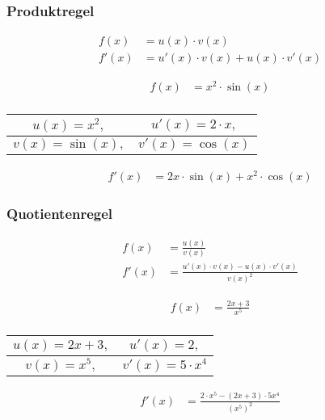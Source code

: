 \documentclass[11pt, openany]{book}
\begin{document}
\subsubsection{Produktregel}
\noindent\begin{minipage}{\boxwidth}
\begin{tcolorbox}
\begin{align*}
    f(x) &= u(x)\cdot v(x) \\
    f'(x) &= u'(x)\cdot v(x) + u(x)\cdot v'(x)
\end{align*}
\end{tcolorbox}
\end{minipage}
\hfill
\begin{minipage}{\examplewidth}
\begin{align*}
    f(x) &= x^2\cdot \sin(x) \\
\end{align*}
\begin{tabular}{|c|c|}
\hline
$u(x) = x^2,$ & $u'(x) = 2\cdot x,$ \\
\hline
$v(x) = \sin(x),$ & $v'(x) = \cos(x)$ \\
\hline
\end{tabular}
\begin{align*}
    f'(x) &= 2x\cdot \sin(x) + x^2\cdot \cos(x)
\end{align*}
\end{minipage}

\subsubsection{Quotientenregel}
\noindent\begin{minipage}{\boxwidth}
\begin{tcolorbox}
\begin{align*}
    f(x) &= \frac{u(x)}{v(x)} \\
    f'(x) &= \frac{u'(x)\cdot v(x) - u(x)\cdot v'(x)}{v(x)^2}
\end{align*}
\end{tcolorbox}
\end{minipage}
\hfill
\begin{minipage}{\examplewidth}
\begin{align*}
    f(x) &= \frac{2x + 3}{x^5} \\
\end{align*}
\begin{tabular}{|c|c|}
\hline
$u(x) = 2x + 3,$ & $u'(x) = 2,$ \\
\hline
$v(x) = x^5,$ & $v'(x) = 5\cdot x^4$ \\
\hline
\end{tabular}
\begin{align*}
    f'(x) &= \frac{2\cdot x^5 - (2x + 3)\cdot 5x^4}{(x^5)^2}
\end{align*}
\end{minipage}
\end{document}
